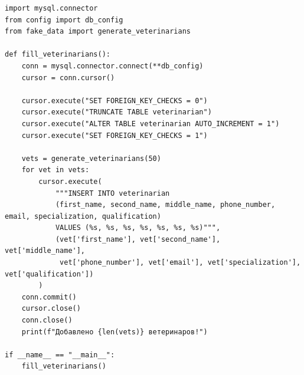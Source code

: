 \documentclass[a4paper]{article}
\begin{document}
\begin{lstlisting}[caption = Заполнение таблицы Veterinarian, basicstyle= \scriptsize \ttfamily]
import mysql.connector
from config import db_config
from fake_data import generate_veterinarians

def fill_veterinarians():
    conn = mysql.connector.connect(**db_config)
    cursor = conn.cursor()

    cursor.execute("SET FOREIGN_KEY_CHECKS = 0")
    cursor.execute("TRUNCATE TABLE veterinarian")
    cursor.execute("ALTER TABLE veterinarian AUTO_INCREMENT = 1")
    cursor.execute("SET FOREIGN_KEY_CHECKS = 1")

    vets = generate_veterinarians(50)
    for vet in vets:
        cursor.execute(
            """INSERT INTO veterinarian 
            (first_name, second_name, middle_name, phone_number, email, specialization, qualification)
            VALUES (%s, %s, %s, %s, %s, %s, %s)""",
            (vet['first_name'], vet['second_name'], vet['middle_name'], 
             vet['phone_number'], vet['email'], vet['specialization'], vet['qualification'])
        )
    conn.commit()
    cursor.close()
    conn.close()
    print(f"Добавлено {len(vets)} ветеринаров!")

if __name__ == "__main__":
    fill_veterinarians()
\end{lstlisting}
\end{document}
